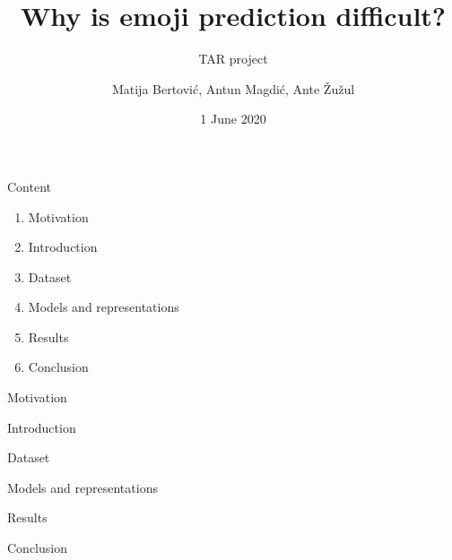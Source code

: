 \documentclass{beamer}
\title{Why is emoji prediction difficult?}
\subtitle{TAR project}
\author{Matija Bertović, Antun Magdić, Ante Žužul}
\institute{University of Zagreb \\ Faculty of Electrical Engineering and Computing}
\date{1 June 2020}
\begin{document}
\maketitle

\begin{frame}{Content}
    \begin{enumerate}
     	\item Motivation
        \item Introduction
        \item Dataset
        \item Models and representations
        \item Results
        \item Conclusion
    \end{enumerate}
\end{frame}


\begin{frame}{Motivation}

\end{frame}


\begin{frame}{Introduction}

\end{frame}


\begin{frame}{Dataset}

\end{frame}


\begin{frame}{Models and representations}

\end{frame}


\begin{frame}{Results}

\end{frame}


\begin{frame}{Conclusion}

\end{frame}
\end{document}
